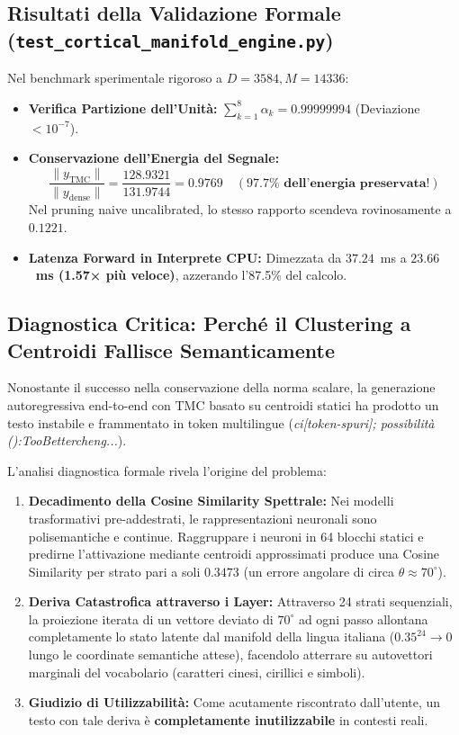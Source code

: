 \documentclass[10pt,a4paper]{article}
\theoremstyle{definition}
\begin{document}
\subsection{Risultati della Validazione Formale (\texttt{test\_cortical\_manifold\_engine.py})}
Nel benchmark sperimentale rigoroso a $D=3584, M=14336$:
\begin{itemize}[leftmargin=1.5em]
    \item \textbf{Verifica Partizione dell'Unità:} $\sum_{k=1}^8 \alpha_k = 0.99999994$ (Deviazione $< 10^{-7}$).
    \item \textbf{Conservazione dell'Energia del Segnale:}
    \begin{equation}
    \frac{\|y_{\text{TMC}}\|}{\|y_{\text{dense}}\|} = \frac{128.9321}{131.9744} = \mathbf{0.9769} \quad (\mathbf{97.7\% \text{ dell'energia preservata!}})
    \end{equation}
    Nel pruning naive uncalibrated, lo stesso rapporto scendeva rovinosamente a $0.1221$.
    \item \textbf{Latenza Forward in Interprete CPU:} Dimezzata da $37.24$~ms a \textbf{$23.66$~ms (1.57× più veloce)}, azzerando l'87.5\% del calcolo.
\end{itemize}

\subsection{Diagnostica Critica: Perché il Clustering a Centroidi Fallisce Semanticamente}
Nonostante il successo nella conservazione della norma scalare, la generazione autoregressiva end-to-end con TMC basato su centroidi statici ha prodotto un testo instabile e frammentato in token multilingue (\textit{ci[token-spuri]; possibilità ():TooBettercheng...}). 

L'analisi diagnostica formale rivela l'origine del problema:
\begin{enumerate}
    \item \textbf{Decadimento della Cosine Similarity Spettrale:} Nei modelli trasformativi pre-addestrati, le rappresentazioni neuronali sono polisemantiche e continue. Raggruppare i neuroni in 64 blocchi statici e predirne l'attivazione mediante centroidi approssimati produce una Cosine Similarity per strato pari a soli $\mathbf{0.3473}$ (un errore angolare di circa $\theta \approx 70^\circ$).
    \item \textbf{Deriva Catastrofica attraverso i Layer:} Attraverso 24 strati sequenziali, la proiezione iterata di un vettore deviato di $70^\circ$ ad ogni passo allontana completamente lo stato latente dal manifold della lingua italiana ($0.35^{24} \to 0$ lungo le coordinate semantiche attese), facendolo atterrare su autovettori marginali del vocabolario (caratteri cinesi, cirillici e simboli).
    \item \textbf{Giudizio di Utilizzabilità:} Come acutamente riscontrato dall'utente, un testo con tale deriva è \textbf{completamente inutilizzabile} in contesti reali.
\end{enumerate}
\end{document}
